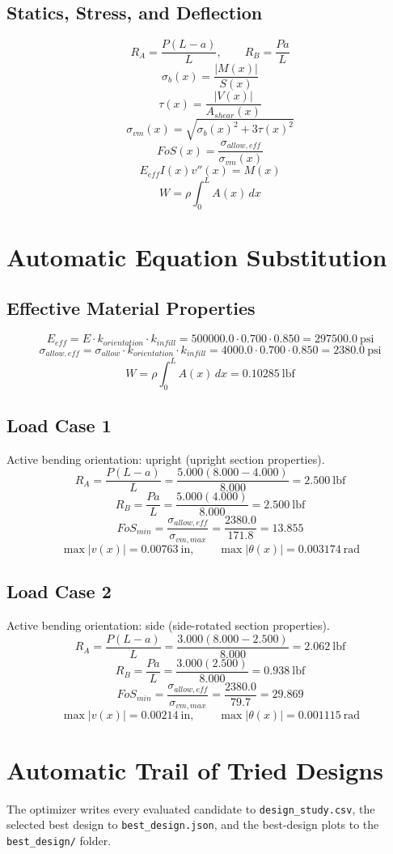 \documentclass[11pt]{article}
\begin{document}
\subsection*{Statics, Stress, and Deflection}
\[
R_A=\frac{P(L-a)}{L}, \qquad R_B=\frac{Pa}{L}
\]
\[
\sigma_b(x)=\frac{|M(x)|}{S(x)}
\]
\[
\tau(x)=\frac{|V(x)|}{A_{shear}(x)}
\]
\[
\sigma_{vm}(x)=\sqrt{\sigma_b(x)^2+3\tau(x)^2}
\]
\[
FoS(x)=\frac{\sigma_{allow,eff}}{\sigma_{vm}(x)}
\]
\[
E_{eff}I(x)v''(x)=M(x)
\]
\[
W=\rho\int_0^L A(x)\,dx
\]

\n\section*{Automatic Equation Substitution}
\subsection*{Effective Material Properties}
\[E_{eff} = E \cdot k_{orientation} \cdot k_{infill} = 500000.0 \cdot 0.700 \cdot 0.850 = 297500.0\ \mathrm{psi}\]
\[\sigma_{allow,eff} = \sigma_{allow} \cdot k_{orientation} \cdot k_{infill} = 4000.0 \cdot 0.700 \cdot 0.850 = 2380.0\ \mathrm{psi}\]
\[W = \rho \int_0^L A(x)\,dx = 0.10285\ \mathrm{lbf}\]
\subsection*{Load Case 1}
Active bending orientation: upright (upright section properties).
\[R_A = \frac{P(L-a)}{L} = \frac{5.000(8.000-4.000)}{8.000} = 2.500\ \mathrm{lbf}\]
\[R_B = \frac{Pa}{L} = \frac{5.000(4.000)}{8.000} = 2.500\ \mathrm{lbf}\]
\[FoS_{min} = \frac{\sigma_{allow,eff}}{\sigma_{vm,max}} = \frac{2380.0}{171.8} = 13.855\]
\[\max |v(x)| = 0.00763\ \mathrm{in}, \qquad \max |\theta(x)| = 0.003174\ \mathrm{rad}\]
\subsection*{Load Case 2}
Active bending orientation: side (side-rotated section properties).
\[R_A = \frac{P(L-a)}{L} = \frac{3.000(8.000-2.500)}{8.000} = 2.062\ \mathrm{lbf}\]
\[R_B = \frac{Pa}{L} = \frac{3.000(2.500)}{8.000} = 0.938\ \mathrm{lbf}\]
\[FoS_{min} = \frac{\sigma_{allow,eff}}{\sigma_{vm,max}} = \frac{2380.0}{79.7} = 29.869\]
\[\max |v(x)| = 0.00214\ \mathrm{in}, \qquad \max |\theta(x)| = 0.001115\ \mathrm{rad}\]

\section*{Automatic Trail of Tried Designs}
The optimizer writes every evaluated candidate to \texttt{design\_study.csv}, the selected best design to \texttt{best\_design.json}, and the best-design plots to the \texttt{best\_design/} folder.
\end{document}
